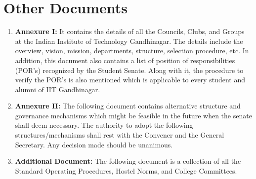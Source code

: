 \documentclass[12pt]{article}
\begin{document}
\section{Other Documents}
\begin{enumerate}
    \item \textbf{Annexure I:} It contains the details of all the Councils, Clubs, and Groups at the Indian Institute of Technology Gandhinagar. The details include the overview, vision, mission, departments, structure, selection procedure, etc. In addition, this document also contains a list of position of responsibilities (POR's) recognized by the Student Senate. Along with it, the procedure to verify the POR's is also mentioned which is applicable to every student and alumni of IIT Gandhinagar.
    \item \textbf{Annexure II:} The following document contains alternative structure and governance mechanisms which might be feasible in the future when the senate shall deem necessary. The authority to adopt the following structures/mechanisms shall rest with the Convener and the General Secretary. Any decision made should be unanimous. 
    \item \textbf{Additional Document:} The following document is a collection of all the Standard Operating Procedures, Hostel Norms, and College Committees. 
\end{enumerate}
\end{document}
